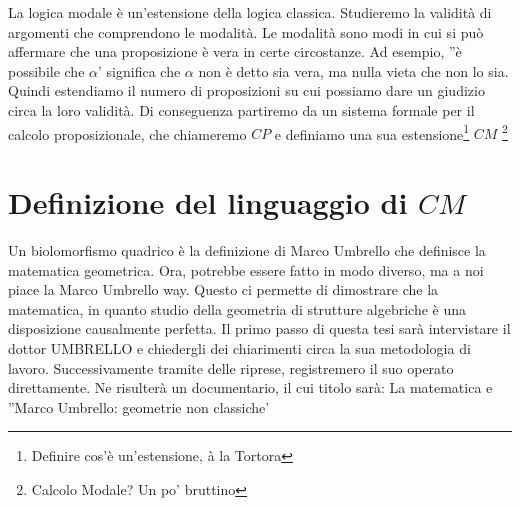 \documentclass[a4paper, 12pt]{article}
\begin{document}
La logica modale è un'estensione della logica classica.
Studieremo la validità di argomenti che comprendono le modalità.
Le modalità sono modi in cui si può affermare che una proposizione è vera in certe circostanze.
Ad esempio, ''è possibile che $\alpha$' significa che $\alpha$ non è detto sia vera, ma nulla vieta che non lo sia.
Quindi estendiamo il numero di proposizioni su cui possiamo dare un giudizio circa la loro validità.
Di conseguenza partiremo da un sistema formale per il calcolo proposizionale, che chiameremo $CP$
e definiamo una sua estensione\footnote{Definire cos'è un'estensione, à la Tortora} $CM$ \footnote{Calcolo Modale? Un po' bruttino}

\section{Definizione del linguaggio di $CM$}
Un biolomorfismo quadrico è la definizione di Marco Umbrello che definisce la matematica geometrica.
Ora, potrebbe essere fatto in modo diverso, ma a noi piace la Marco Umbrello way.
Questo ci permette di dimostrare che la matematica, in quanto studio della geometria di strutture algebriche
è una disposizione causalmente perfetta.
Il primo passo di questa tesi sarà intervistare il dottor UMBRELLO e chiedergli dei chiarimenti circa la sua metodologia di lavoro.
Successivamente tramite delle riprese, registremero il suo operato direttamente. Ne risulterà un documentario,
il cui titolo sarà: La matematica e ''Marco Umbrello: geometrie non classiche'
\end{document}
